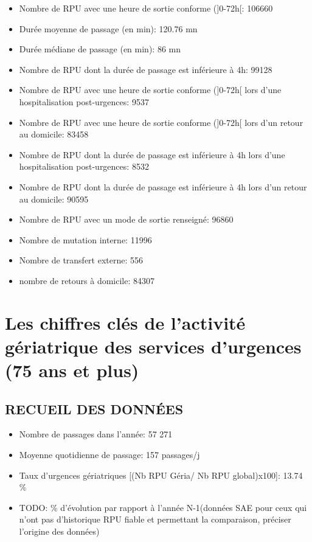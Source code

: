\documentclass[]{article}
\begin{document}
\begin{itemize}
\item
  Nombre de RPU avec une heure de sortie conforme ({]}0-72h{[}: 106660
\item
  Durée moyenne de passage (en min): 120.76 mn
\item
  Durée médiane de passage (en min): 86 mn
\item
  Nombre de RPU dont la durée de passage est inférieure à 4h: 99128
\item
  Nombre de RPU avec une heure de sortie conforme ({]}0-72h{[} lors
  d'une hospitalisation post-urgences: 9537
\item
  Nombre de RPU avec une heure de sortie conforme ({]}0-72h{[} lors d'un
  retour au domicile: 83458
\item
  Nombre de RPU dont la durée de passage est inférieure à 4h lors d'une
  hospitalisation post-urgences: 8532
\item
  Nombre de RPU dont la durée de passage est inférieure à 4h lors d'un
  retour au domicile: 90595
\item
  Nombre de RPU avec un mode de sortie renseigné: 96860
\item
  Nombre de mutation interne: 11996
\item
  Nombre de transfert externe: 556
\item
  nombre de retours à domicile: 84307
\end{itemize}

\section{Les chiffres clés de l'activité gériatrique des services
d'urgences (75 ans et
plus)}\label{les-chiffres-cles-de-lactivite-geriatrique-des-services-durgences-75-ans-et-plus}

\subsection{RECUEIL DES DONNÉES}\label{recueil-des-donnees-1}

\begin{itemize}
\itemsep1pt\parskip0pt
\item
  Nombre de passages dans l'année: 57 271
\item
  Moyenne quotidienne de passage: 157 passages/j
\item
  Taux d'urgences gériatriques {[}(Nb RPU Géria/ Nb RPU global)x100{]}:
  13.74 \%
\item
  TODO: \% d'évolution par rapport à l'année N-1(données SAE pour ceux
  qui n'ont pas d'historique RPU fiable et permettant la comparaison,
  préciser l'origine des données)
\end{itemize}
\end{document}
